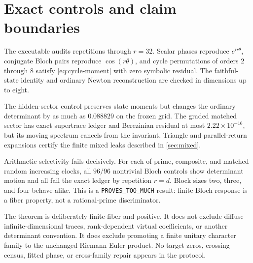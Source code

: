 \section{Exact controls and claim boundaries}
\label{sec:controls}

The executable audits repetitions through $r=32$.  Scalar phases reproduce
$e^{ir\theta}$, conjugate Bloch pairs reproduce $\cos(r\theta)$, and cycle
permutations of orders $2$ through $8$ satisfy \eqref{eq:cycle-moment} with zero symbolic
residual.  The faithful-state identity and ordinary Newton reconstruction are
checked in dimensions up to eight.

The hidden-sector control preserves state moments but changes the ordinary
determinant by as much as $0.088829$ on the frozen grid.  The graded matched
sector has exact supertrace ledger and Berezinian residual at most
$2.22\times10^{-16}$, but its moving spectrum cancels from the invariant.
Triangle and parallel-return expansions certify the finite mixed leaks
described in \cref{sec:mixed}.

Arithmetic selectivity fails decisively.  For each of prime, composite, and
matched random increasing clocks, all $96/96$ nontrivial Bloch controls show
determinant motion and all fail the exact ledger by repetition $r=d$.
Block sizes two, three, and four behave alike.  This is a
\texttt{PROVES\_TOO\_MUCH} result: finite Bloch response is a fiber property,
not a rational-prime discriminator.

The theorem is deliberately finite-fiber and positive.  It does not exclude
diffuse infinite-dimensional traces, rank-dependent virtual coefficients, or
another determinant convention.  It does exclude promoting a finite unitary
character family to the unchanged Riemann Euler product.  No target zeros,
crossing census, fitted phase, or cross-family repair appears in the protocol.
